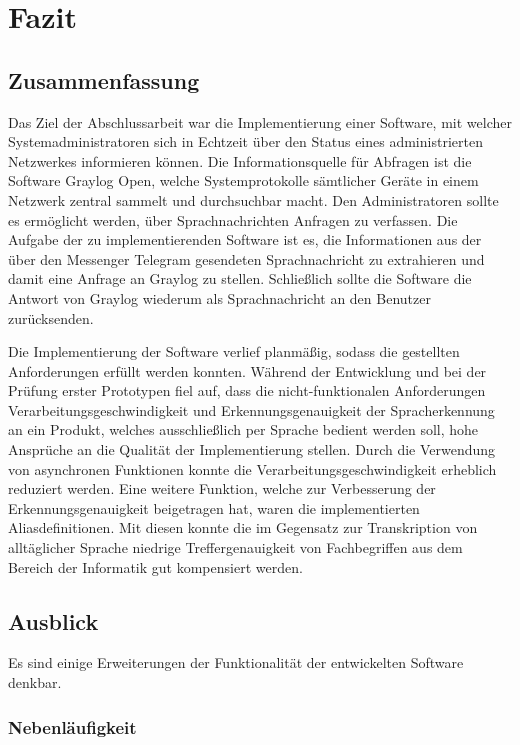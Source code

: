 \chapter{Fazit}
\label{cha:fazit}

\section{Zusammenfassung}

Das Ziel der Abschlussarbeit war die Implementierung einer Software, mit welcher Systemadministratoren sich in Echtzeit über den Status eines administrierten Netzwerkes informieren können. Die Informationsquelle für Abfragen ist die Software Graylog Open, welche Systemprotokolle sämtlicher Geräte in einem Netzwerk zentral sammelt und durchsuchbar macht. Den Administratoren sollte es ermöglicht werden, über Sprachnachrichten Anfragen zu verfassen. Die Aufgabe der zu implementierenden Software ist es, die Informationen aus der über den Messenger Telegram gesendeten Sprachnachricht zu extrahieren und damit eine Anfrage an Graylog zu stellen. Schließlich sollte die Software die Antwort von Graylog wiederum als Sprachnachricht an den Benutzer zurücksenden. 

Die Implementierung der Software verlief planmäßig, sodass die gestellten Anforderungen erfüllt werden konnten. Während der Entwicklung und bei der Prüfung erster Prototypen fiel auf, dass die nicht-funktionalen Anforderungen Verarbeitungsgeschwindigkeit und Erkennungsgenauigkeit der Spracherkennung an ein Produkt, welches ausschließlich per Sprache bedient werden soll, hohe Ansprüche an die Qualität der Implementierung stellen. Durch die Verwendung von asynchronen Funktionen konnte die Verarbeitungsgeschwindigkeit erheblich reduziert werden. Eine weitere Funktion, welche zur Verbesserung der Erkennungsgenauigkeit beigetragen hat, waren die implementierten Aliasdefinitionen. Mit diesen konnte die im Gegensatz zur Transkription von alltäglicher Sprache niedrige Treffergenauigkeit von Fachbegriffen aus dem Bereich der Informatik gut kompensiert werden. 

\section{Ausblick}

Es sind einige Erweiterungen der Funktionalität der entwickelten Software denkbar. 

\subsection{Nebenläufigkeit}

